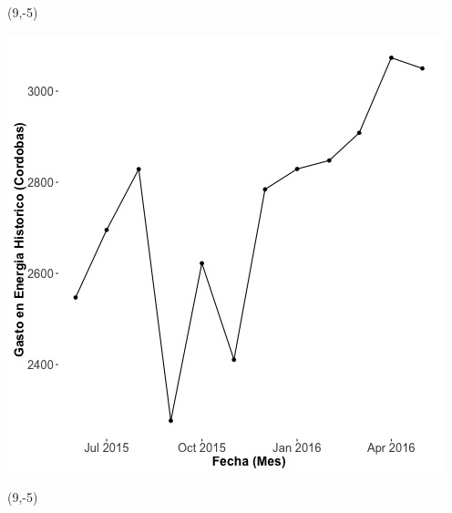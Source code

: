 \documentclass{article}\usepackage[]{graphicx}\usepackage[]{color}
\newenvironment{knitrout}{}{} %
\begin{document}
 \begin{textblock}{1}(9,-5)
\begin{minipage}{20em}
\begingroup

\endgroup
\end{minipage}
\end{textblock}

\begin{knitrout}
\color{fgcolor}
\includegraphics[scale=0.65]{figure/A17_historico_cordobas} 
\end{knitrout}

 \begin{textblock}{1}(9,-5)
\begin{minipage}{20em}
\begingroup

\endgroup
\end{minipage}
\end{textblock}
\end{document}
